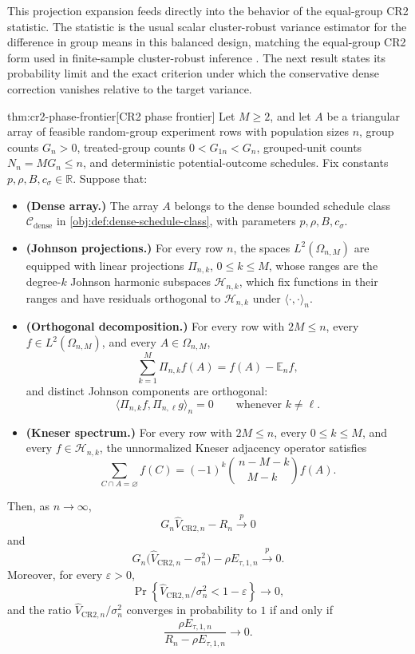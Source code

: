 This projection expansion feeds directly into the behavior of the equal-group CR2 statistic. The statistic  is the usual scalar cluster-robust variance estimator for the difference in group means in this balanced design, matching the equal-group CR2 form used in finite-sample cluster-robust inference \citep{PustejovskyTipton2018}. The next result states its probability limit and the exact criterion under which the conservative dense correction vanishes relative to the target variance.

\begin{theoremv}{thm:cr2-phase-frontier}[CR2 phase frontier]
Let \(M\ge 2\), and let \(A\) be a triangular array of feasible random-group experiment rows with population sizes \(n\), group counts \(G_n>0\), treated-group counts \(0<G_{1n}<G_n\), grouped-unit counts \(N_n=MG_n\le n\), and deterministic potential-outcome schedules.  Fix constants \(p,\rho,B,c_\sigma\in\mathbb R\).  Suppose that:
\begin{itemize}
\item \textbf{(Dense array.)} The array \(A\) belongs to the dense bounded schedule class \(\mathcal C_{\mathrm{dense}}\) in \cref{obj:def:dense-schedule-class}, with parameters \(p,\rho,B,c_\sigma\).
\item \textbf{(Johnson projections.)} For every row \(n\), the spaces \(L^2(\Omega_{n,M})\) are equipped with linear projections \(\Pi_{n,k}\), \(0\le k\le M\), whose ranges are the degree-\(k\) Johnson harmonic subspaces \(\mathcal H_{n,k}\), which fix functions in their ranges and have residuals orthogonal to \(\mathcal H_{n,k}\) under \(\langle\cdot,\cdot\rangle_n\).
\item \textbf{(Orthogonal decomposition.)} For every row with \(2M\le n\), every \(f\in L^2(\Omega_{n,M})\), and every \(A\in\Omega_{n,M}\),
\[
\sum_{k=1}^{M}\Pi_{n,k}f(A)=f(A)-\mathbb E_n f,
\]
and distinct Johnson components are orthogonal:
\[
\langle \Pi_{n,k}f,\Pi_{n,\ell}g\rangle_n=0
\qquad\text{whenever } k\ne \ell .
\]
\item \textbf{(Kneser spectrum.)} For every row with \(2M\le n\), every \(0\le k\le M\), and every \(f\in\mathcal H_{n,k}\), the unnormalized Kneser adjacency operator satisfies
\[
\sum_{C\cap A=\varnothing} f(C)
=
(-1)^k {\,n-M-k\choose M-k\,} f(A).
\]
\end{itemize}
Then, as \(n\to\infty\),
\[
G_n\widehat V_{\mathrm{CR2},n}-R_n \xrightarrow{p}0
\]
and
\[
G_n\bigl(\widehat V_{\mathrm{CR2},n}-\sigma_n^2\bigr)
-\rho E_{\tau,1,n}
\xrightarrow{p}0 .
\]
Moreover, for every \(\varepsilon>0\),
\[
\Pr\!\left\{
\widehat V_{\mathrm{CR2},n}/\sigma_n^2<1-\varepsilon
\right\}\longrightarrow 0 ,
\]
and the ratio \(\widehat V_{\mathrm{CR2},n}/\sigma_n^2\) converges in probability to \(1\) if and only if
\[
\frac{\rho E_{\tau,1,n}}{R_n-\rho E_{\tau,1,n}}\longrightarrow 0 .
\]
\end{theoremv}

